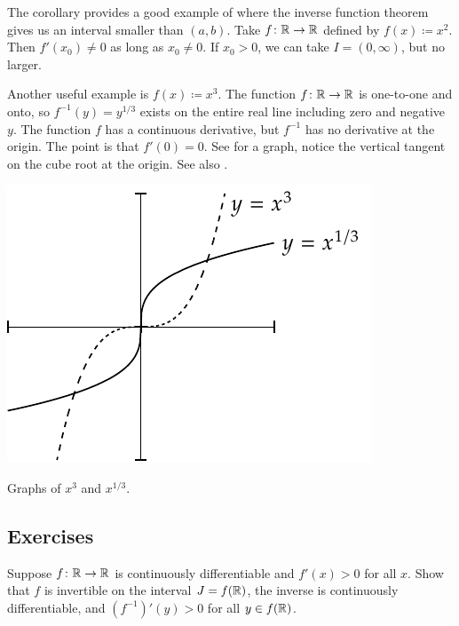 \begin{example}
The corollary provides a good example of where the inverse function theorem
gives us an interval smaller than $(a,b)$.  Take $f \colon {\mathbb{R}} \to {\mathbb{R}}$
defined by $f(x) \coloneqq x^2$.  Then $f'(x_0) \not= 0$
as long as $x_0 \not= 0$.  If $x_0 > 0$, we can take $I=(0,\infty)$, but
no larger.
\end{example}

\begin{example}
Another useful example is $f(x) \coloneqq x^3$.  The function $f \colon {\mathbb{R}} \to {\mathbb{R}}$ is
one-to-one and onto, so $f^{-1}(y) = y^{1/3}$ exists on the entire real
line including zero and negative $y$.  The function $f$ has
a continuous derivative, but $f^{-1}$ has no derivative at the origin.  The
point is that $f'(0) = 0$.  See  for a graph,
notice the vertical tangent on the cube root at the origin.
See also .
\begin{myfigureht}
\includegraphics{figures/cubecuberoot}
\caption{Graphs of $x^3$ and $x^{1/3}$.\label{cubecuberootfig}}
\end{myfigureht}
\end{example}


\subsection{Exercises}

\begin{exercise}
Suppose $f \colon {\mathbb{R}} \to {\mathbb{R}}$ is continuously differentiable and
$f'(x) > 0$ for all $x$.  Show that $f$ is invertible on the interval $J =
f({\mathbb{R}})$, the inverse is continuously differentiable, and ${(f^{-1})}'(y) >
0$ for all $y \in f({\mathbb{R}})$.
\end{exercise}

